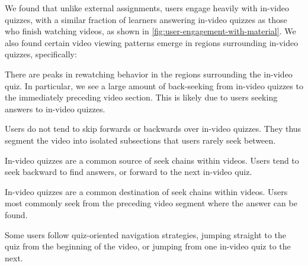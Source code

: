 \documentclass{sigchi}
\begin{document}
We found that unlike external assignments, users engage heavily with in-video quizzes, with a similar fraction of learners answering in-video quizzes as those who finish watching videos, as shown in \autoref{fig:user-engagement-with-material}. We also found certain video viewing patterns emerge in regions surrounding in-video quizzes, specifically: %

\begin{compactitem}
\item There are peaks in rewatching behavior in the regions surrounding the in-video quiz. In particular, we see a large amount of back-seeking from in-video quizzes to the immediately preceding video section. This is likely due to users seeking answers to in-video quizzes.
\item Users do not tend to skip forwards or backwards over in-video quizzes. They thus segment the video into isolated subsections that users rarely seek between.
\item In-video quizzes are a common source of seek chains within videos. Users tend to seek backward to find answers, or forward to the next in-video quiz.
\item In-video quizzes are a common destination of seek chains within videos. Users most commonly seek from the preceding video segment where the answer can be found.
\item Some users follow quiz-oriented navigation strategies, jumping straight to the quiz from the beginning of the video, or jumping from one in-video quiz to the next.
\end{compactitem}

\end{document}
